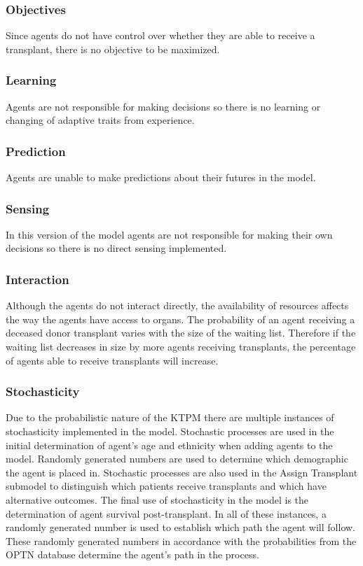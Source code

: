 \documentclass[9pt,a4paper,twocolumn]{scrartcl}
\begin{document}
\subsubsection{Objectives}
Since agents do not have control over whether they are able to receive a transplant, there is no objective to be maximized.

\subsubsection{Learning}
Agents are not responsible for making decisions so there is no learning or changing of adaptive traits from experience.

\subsubsection{Prediction}
Agents are unable to make predictions about their futures in the model.

\subsubsection{Sensing}
In this version of the model agents are not responsible for making their own decisions so there is no direct sensing implemented.

\subsubsection{Interaction}
Although the agents do not interact directly, the availability of resources affects the way the agents have access to organs.  The probability of an agent receiving a deceased donor transplant varies with the size of the waiting list.  Therefore if the waiting list decreases in size by more agents receiving transplants, the percentage of agents able to receive transplants will increase.

\subsubsection{Stochasticity}
Due to the probabilistic nature of the KTPM there are multiple instances of stochasticity implemented in the model.  Stochastic processes are used in the initial determination of agent’s age and ethnicity when adding agents to the model.  Randomly generated numbers are used to determine which demographic the agent is placed in.  Stochastic processes are also used in the Assign Transplant submodel to distinguish which patients receive transplants and which have alternative outcomes.  The final use of stochasticity in the model is the determination of agent survival post-transplant.  In all of these instances, a randomly generated number is used to establish which path the agent will follow.  These randomly generated numbers in accordance with the probabilities from the OPTN database determine the agent’s path in the process.
\end{document}
